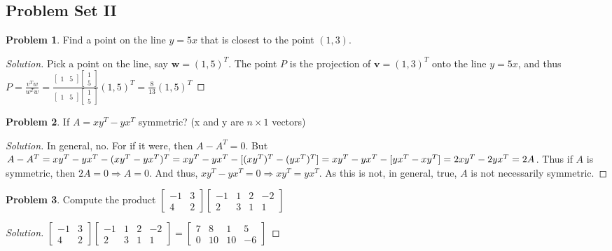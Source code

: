 \documentclass[oneside]{book}
\theoremstyle{definition}
\newtheorem{problem}{Problem}[section]
\newcommand*\B[1]{\mathbf{#1}}
\begin{document}
\subsection*{Problem Set II}

\begin{problem}
Find a point on the line $y=5x$ that is closest to the point $(1,3)$.
\end{problem}
\begin{proof}[Solution]
Pick a point on the line, say $\B{w} = (1,5)^T$. The point $P$ is the projection of $\B{v} = (1,3)^T$ onto the line $y=5x$, and thus $P = \frac{v^T w}{w^T w} = \frac{\begin{bmatrix}1 & 5 \end{bmatrix}\begin{bmatrix}1 \\ 5\end{bmatrix}}{\begin{bmatrix}1 & 5 \end{bmatrix}\begin{bmatrix}1 \\ 5\end{bmatrix}}(1,5)^T = \frac{8}{13}(1,5)^T$
\end{proof}

\begin{problem}
If $A = xy^T - yx^T$ symmetric? (x and y are $n\times 1$ vectors)
\end{problem}
\begin{proof}[Solution]
In general, no. For if it were, then $A-A^T = 0$. But $A-A^T = xy^T - yx^T - (xy^T-yx^T)^T =\\ xy^T - yx^T -[(xy^T)^T-(yx^T)^T] = xy^T - yx^T - [yx^T - xy^T] = 2xy^T-2yx^T = 2A$. Thus if $A$ is symmetric, then $2A = 0\Rightarrow A = 0$. And thus, $xy^T - yx^T = 0 \Rightarrow xy^T = yx^T$. As this is not, in general, true, $A$ is not necessarily symmetric.
\end{proof}

\begin{problem}
Compute the product $\begin{bmatrix} -1 & 3 \\ 4 & 2 \end{bmatrix} \begin{bmatrix} -1 & 1 & 2 & -2 \\ 2 & 3 & 1 & 1 \end{bmatrix}$
\end{problem}
\begin{proof}[Solution]
$\begin{bmatrix} -1 & 3 \\ 4 & 2 \end{bmatrix} \begin{bmatrix} -1 & 1 & 2 & -2 \\ 2 & 3 & 1 & 1 \end{bmatrix} = \begin{bmatrix} 7 & 8 & 1 & 5 \\ 0 & 10 & 10 & -6 \end{bmatrix}$
\end{proof}
\end{document}
